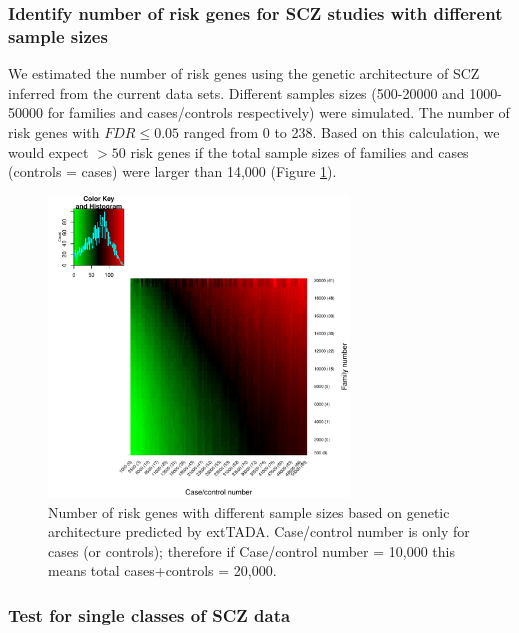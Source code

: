 \documentclass[]{article}
\begin{document}
\subsubsection{Identify number of risk genes for SCZ studies with
  different sample sizes}
We estimated the number of risk genes using the genetic architecture of SCZ inferred from the
current data sets. Different samples sizes (500-20000 and 1000-50000
for families and cases/controls respectively) were simulated. The
number of risk genes with $FDR \le 0.05$ ranged from 0 to 238. Based on
this calculation, we would
expect $> 50$ risk genes if the total sample sizes of families and cases (controls = cases) were
larger than 14,000 (Figure \ref{fig:heatmapcountgenepower}).

\begin{figure}[h]
\includegraphics[width=\textwidth,height=8cm]{Picture//heatmap_countgene_powerFDR005.pdf}
\caption{Number of risk genes with different sample sizes based on
  genetic architecture predicted by extTADA. Case/control number is
  only for cases (or controls); therefore if Case/control number =
  10,000 this means total cases+controls = 20,000.}
\label{fig:heatmapcountgenepower}
\end{figure}

\subsubsection{Test for single classes of SCZ data}
\end{document}
